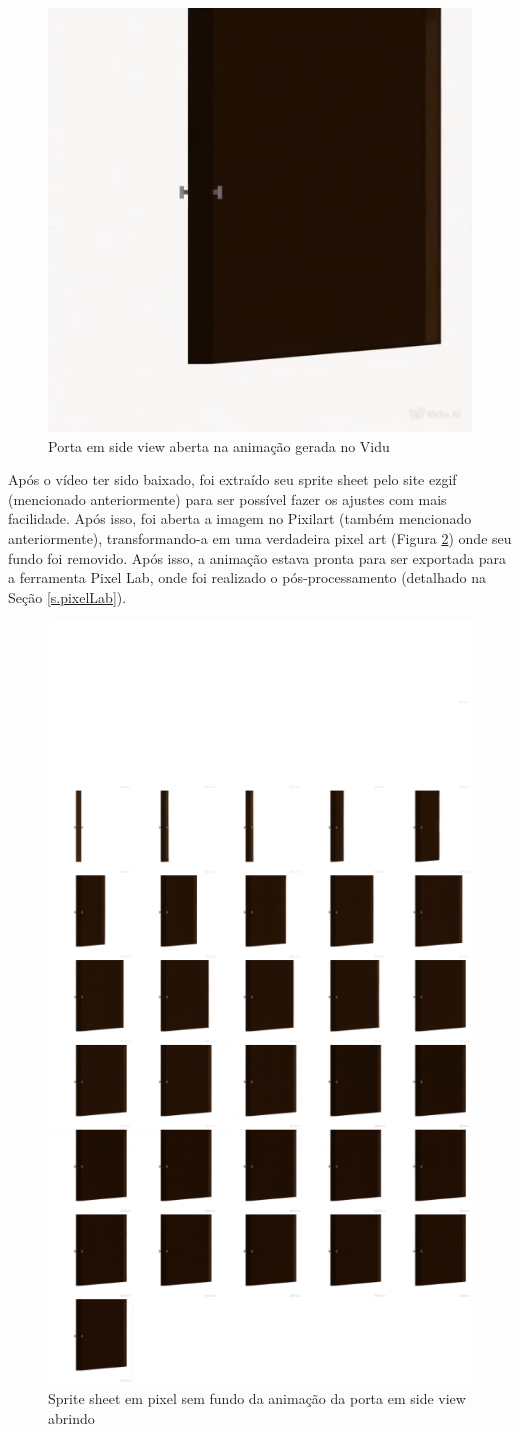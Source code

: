 \begin{figure}[htbp]
    \centering
    \caption{\small Porta em side view aberta na animação gerada no Vidu}
    \label{fig:viduPortaFinalAberta}
    \includegraphics[width=0.4\linewidth]{figs/vidu/frameFinal.jpg}
\end{figure}

Após o vídeo ter sido baixado, foi extraído seu sprite sheet pelo site ezgif (mencionado anteriormente) para ser possível fazer os ajustes com mais facilidade. Após isso, foi aberta a imagem no Pixilart (também mencionado anteriormente), transformando-a em uma verdadeira pixel art (Figura \ref{fig:viduPortaFinalSpriteSheetPixel}) onde seu fundo foi removido. Após isso, a animação estava pronta para ser exportada para a ferramenta Pixel Lab, onde foi realizado o pós-processamento (detalhado na Seção \ref{s.pixelLab}).

\begin{figure}[htbp]
    \centering
    \caption{\small Sprite sheet em pixel sem fundo da animação da porta em side view abrindo}
    \label{fig:viduPortaFinalSpriteSheetPixel}
    \includegraphics[width=0.4\linewidth]{figs/vidu/Pixilart/porta_sprite_sheet_pixel.png}
\end{figure}

